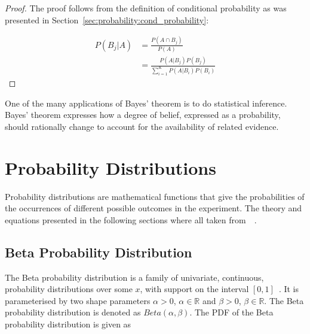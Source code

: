 \begin{proof}
      The proof follows from the definition of conditional probability as was presented in Section~\ref{sec:probability:cond_probability}:

      \begin{equation}
            \begin{split}
                  P(B_{j} \vert A)
                  &= \frac{P(A \cap B_{j})}{P(A)}\\
                  &= \frac{P(A \vert B_{j})P(B_{j})}{\sum_{i=1}^{K} P(A \vert B_{i})P(B_{i})}
            \end{split}
      \end{equation}
\end{proof}

One of the many applications of Bayes' theorem is to do statistical inference. Bayes' theorem expresses how a degree of belief, expressed as a probability, should rationally change to account for the availability of related evidence.


\section{Probability Distributions}\label{sec:probability:probability_distributions}

Probability distributions are mathematical functions that give the probabilities of the occurrences of different possible outcomes in the experiment. The theory and equations presented in the following sections where all taken from~\citeauthor{ref:wackerly:2014}~\cite{ref:wackerly:2014}.


\subsection{Beta Probability Distribution}\label{sec:probability:probability_distributions:beta}

The Beta probability distribution is a family of univariate, continuous, probability distributions over some $x$, with support on the interval $[0,1]$~\cite{ref:wackerly:2014}. It is parameterised by two shape parameters $\alpha > 0$, $\alpha \in \mathbb{R}$ and $\beta > 0$, $\beta \in \mathbb{R}$. The Beta probability distribution is denoted as $Beta(\alpha, \beta)$. The \acf{PDF} of the Beta probability distribution is given as

